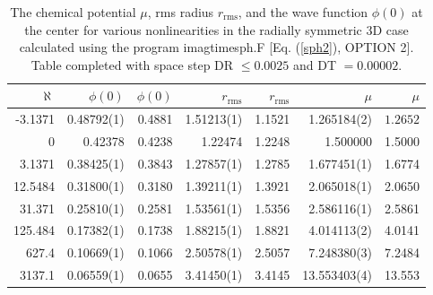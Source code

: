 \documentclass[onecolumn]{elsart3p}
\begin{document}
\begin{table}[!ht]
\begin{center}
\caption{The chemical potential $\mu$, rms radius {$r_{\mathrm{rms}}$}, and the wave function
$\phi(0)$ at the center  for various
nonlinearities in the radially symmetric 3D case calculated using the
program imagtimesph.F [Eq. (\ref{sph2}), OPTION 2]. Table completed with space step
DR $
\le 0.0025$
and DT $=0.00002$. }
\label{table2}
\begin{tabular}{|r|r|r|r|r|r|r|}
\hline
{$ \aleph $
} &   {$\phi(0)$} &
$\phi(0)$ \cite{Bao_Tang}&
{$r_{\mathrm{rms}}$}      &
$r_{\mathrm{rms}}$ \cite{Bao_Tang}&
{$\mu$}  &{$\mu$ \cite{Tiwari_Shukla,Bao_Tang}} \\
\hline
-3.1371 & 0.48792(1) &  0.4881 & 1.51213(1)& 1.1521& 1.265184(2) &
$1.2652$ \\
       0 &  0.42378 & 0.4238& 1.22474& 1.2248 & 1.500000 &1.5000
\\
    3.1371 &0.38425(1)& 0.3843 &1.27857(1)   &1.2785 & 1.677451(1)  &
1.6774\\
   12.5484 & 0.31800(1)  & 0.3180 &  1.39211(1)  & 1.3921 &
2.065018(1) &
2.0650 \\
  31.371 & 0.25810(1)&  0.2581  & 1.53561(1)& 1.5356  &  2.586116(1) &
2.5861 \\
125.484 &  0.17382(1) &  0.1738 &  1.88215(1) &1.8821 &  4.014113(2)
&4.0141 \\
  627.4 & 0.10669(1) &0.1066 & 2.50578(1) &2.5057 & 7.248380(3)  &
7.2484
\\
    3137.1 &0.06559(1) &0.0655 & 3.41450(1) &3.4145 &  13.553403(4)  &
13.553
\\
\hline
\end{tabular}
\end{center}
\end{table}
\end{document}
